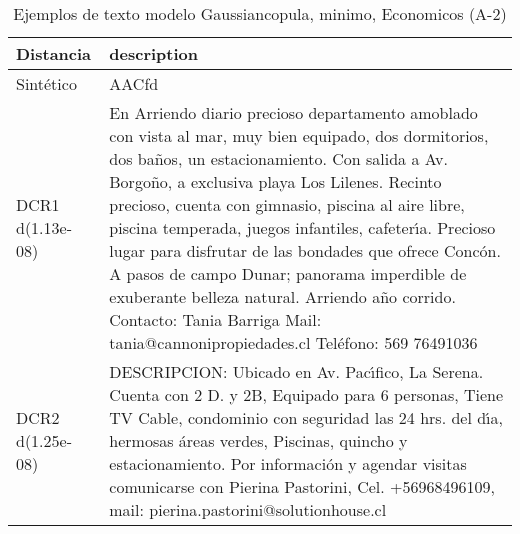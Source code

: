 \begin{table}[H]
\centering
\fontsize{10}{14}\selectfont
\caption{Ejemplos de texto modelo Gaussiancopula, minimo, Economicos (A-2)}
\label{table-example-economicos-a-2-gaussiancopula-min-text}
\begin{tabular}{|l|m{35em}|}
\hline
\rowcolor[gray]{0.8}
Distancia & description \\
\hline Sintético & AACfd \\
\hline DCR1 d(1.13e-08) & En Arriendo diario precioso departamento amoblado con vista al mar, muy bien equipado, dos dormitorios, dos ba\~nos, un estacionamiento. Con salida a Av. Borgo\~no, a exclusiva playa Los Lilenes. Recinto precioso, cuenta con gimnasio, piscina al aire libre, piscina temperada, juegos infantiles, cafeter{\'\i}a. Precioso lugar para disfrutar de las bondades que ofrece Conc\'on. A pasos de campo Dunar; panorama imperdible de exuberante belleza natural. Arriendo a\~no corrido.  Contacto: Tania Barriga Mail: tania@cannonipropiedades.cl Tel\'efono: 569 76491036 \\
\hline DCR2 d(1.25e-08) & DESCRIPCION: Ubicado en Av. Pac{\'\i}fico, La Serena. Cuenta con 2 D. y 2B, Equipado para 6 personas, Tiene TV Cable, condominio con seguridad las 24 hrs. del d{\'\i}a, hermosas \'areas verdes, Piscinas, quincho y estacionamiento.  Por informaci\'on y agendar visitas comunicarse con Pierina Pastorini, Cel. +56968496109, mail: pierina.pastorini@solutionhouse.cl \\
\hline
\end{tabular}
\end{table}
